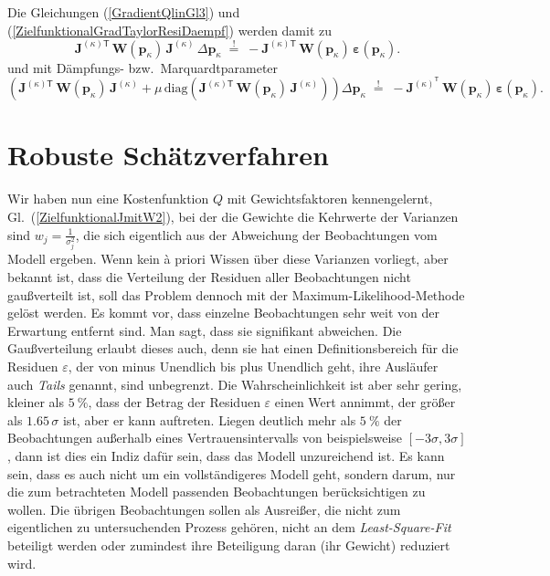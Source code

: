 Die Gleichungen (\ref{GradientQlinGl3}) und (\ref{ZielfunktionalGradTaylorResiDaempf})
werden damit zu
\begin{equation}
 \boldsymbol{J}^{(\kappa) \textsf{T}} \, \mathbf{W}(\mathbf{p}_\kappa) \,
\boldsymbol{J}^{(\kappa)} \, \Delta \mathbf{p}_\kappa
\; \overset{!}{=} \;
-  \boldsymbol{J}^{(\kappa) \textsf{T}} \, \mathbf{W}(\mathbf{p}_\kappa) \,
\boldsymbol{\varepsilon}(\mathbf{p}_\kappa) .
\label{GradientQlinGl3W}
\end{equation}
und mit Dämpfungs- bzw.\ Marquardtparameter
\begin{equation}
\left(
\boldsymbol{J}^{(\kappa) \textsf{T}} \, \mathbf{W}(\mathbf{p}_\kappa) \, \boldsymbol{J}^{(\kappa)}
 + \mu \, \mathrm{diag}(\boldsymbol{J}^{(\kappa) \textsf{T}} \, \mathbf{W}(\mathbf{p}_\kappa) \, \boldsymbol{J}^{(\kappa)}) \right) \Delta \mathbf{p}_\kappa \;
\overset{!}{=} \; - \boldsymbol{J}^{(\kappa)^\textsf{T}} \,
\mathbf{W}(\mathbf{p}_\kappa) \, \boldsymbol{\varepsilon}(\mathbf{p}_\kappa) .
\label{ZielfunktionalGradTaylorResiDaempfW}
\end{equation}


\section{Robuste Schätzverfahren}
\label{robustEstimation}
Wir haben nun eine Kostenfunktion $Q$ mit Gewichtsfaktoren kennengelernt, Gl.~(\ref{ZielfunktionalJmitW2}),
bei der die Gewichte die Kehrwerte der Varianzen sind $w_j = \frac{1}{\sigma_j^2}$, die sich eigentlich
aus der Abweichung der Beobachtungen vom Modell ergeben. Wenn kein {\`a} priori Wissen über
diese Varianzen vorliegt, aber bekannt ist, dass die Verteilung der
Residuen aller Beobachtungen nicht gauß\-ver\-teilt ist, soll das Problem dennoch mit der
Maximum-Likelihood-Methode gelöst werden. Es kommt vor, dass einzelne Beobachtungen
sehr weit von der Erwartung entfernt sind. Man sagt, dass sie signifikant abweichen. Die Gaußverteilung erlaubt dieses auch, denn sie hat einen Definitionsbereich für die Residuen $\varepsilon$,
der von minus Unendlich bis plus Unendlich geht, ihre Ausläufer auch \textsl{Tails} genannt,
sind unbegrenzt. Die Wahrscheinlichkeit ist aber sehr gering, kleiner als $5~\%$, dass der Betrag der
Residuen $\varepsilon$ einen Wert annimmt, der größer als
$1.65 \, \sigma$ ist, aber er kann auftreten. Liegen deutlich mehr als $5~\%$
der Beobachtungen außerhalb eines Vertrauensintervalls von beispielsweise $[-3 \sigma, 3 \sigma]$,
dann ist dies ein Indiz dafür sein, dass das Modell unzureichend ist. Es kann sein, dass es auch nicht
um ein vollständigeres Modell geht, sondern darum, nur die zum betrachteten Modell passenden Beobachtungen
berücksichtigen zu wollen. Die übrigen Beobachtungen sollen als Ausreißer, die nicht zum
eigentlichen zu untersuchenden Prozess gehören, nicht an dem \textsl{Least-Square-Fit}
beteiligt werden oder zumindest ihre Beteiligung daran (ihr Gewicht) reduziert wird.

